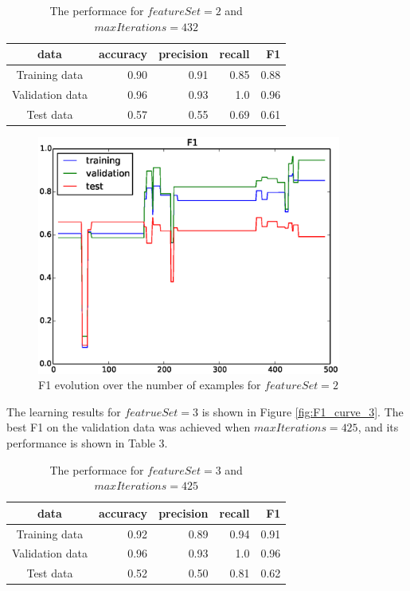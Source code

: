 \begin{table}[htb]
\centering
  \begin{tabular}{|c|r|r|r|r|} \hline
    data & accuracy & precision & recall & F1 \\ \hline
    Training data & 0.90 & 0.91 & 0.85 & 0.88 \\ \hline
    Validation data & 0.96 & 0.93 & 1.0 & 0.96 \\ \hline
    Test data & 0.57 & 0.55 & 0.69 & 0.61 \\ \hline
  \end{tabular}
  \caption{The performace for $featureSet = 2$ and $maxIterations = 432$}
\end{table}

\begin{figure}[hbtp]
\centering
\includegraphics[width=100mm]{F1_curve_2}
\caption{F1 evolution over the number of examples for $featureSet=2$}
\label{fig:F1_curve_2}
\end{figure}

The learning results for $featrueSet=3$ is shown in Figure \ref{fig:F1_curve_3}. The best F1 on the validation data was achieved when $maxIterations=425$, and its performance is shown in Table 3.

\begin{table}[htb]
\centering
  \begin{tabular}{|c|r|r|r|r|} \hline
    data & accuracy & precision & recall & F1 \\ \hline
    Training data & 0.92 & 0.89 & 0.94 & 0.91 \\ \hline
    Validation data & 0.96 & 0.93 & 1.0 & 0.96 \\ \hline
    Test data & 0.52 & 0.50 & 0.81 & 0.62 \\ \hline
  \end{tabular}
  \caption{The performace for $featureSet = 3$ and $maxIterations = 425$}
\end{table}

